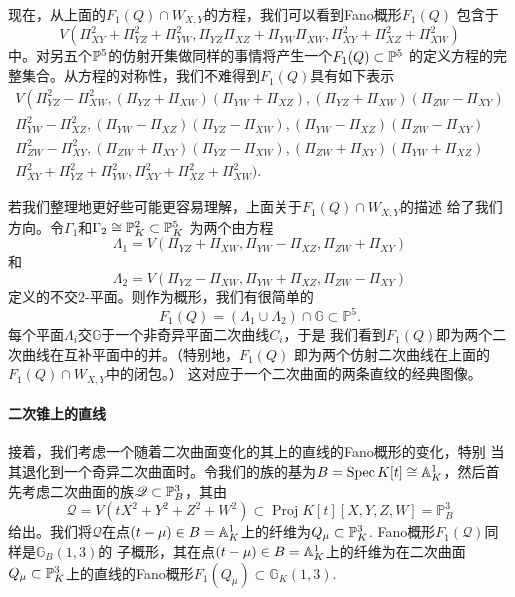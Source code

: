 现在，从上面的$F_1(Q)\cap W_{X,Y}$的方程，我们可以看到Fano概形$F_1(Q)$
包含于
\[
	V(\Pi_{XY}^2+\Pi_{YZ}^2+\Pi_{YW}^2,\Pi_{YZ}\Pi_{XZ}+\Pi_{YW}\Pi_{XW},\Pi_{XY}^2+\Pi_{XZ}^2+\Pi_{XW}^2)
\]
中。对另五个$\P^5$的仿射开集做同样的事情将产生一个$F_1(Q)\subset \P^5$
的定义方程的完整集合。从方程的对称性，我们不难得到$F_1(Q)$具有如下表示
\[
\begin{array}{l}{V\left(\Pi_{Y Z}^{2}-\Pi_{X W}^{2},\left(\Pi_{Y Z}+\Pi_{X W}\right)\left(\Pi_{Y W}+\Pi_{X Z}\right),\left(\Pi_{Y Z}+\Pi_{X W}\right)\left(\Pi_{Z W}-\Pi_{X Y}\right)\right.} \\ {\Pi_{Y W}^{2}-\Pi_{X Z}^{2},\left(\Pi_{Y W}-\Pi_{X Z}\right)\left(\Pi_{Y Z}-\Pi_{X W}\right),\left(\Pi_{Y W}-\Pi_{X Z}\right)\left(\Pi_{Z W}-\Pi_{X Y}\right)} \\ {\Pi_{Z W}^{2}-\Pi_{X Y}^{2},\left(\Pi_{Z W}+\Pi_{X Y}\right)\left(\Pi_{Y Z}-\Pi_{X W}\right),\left(\Pi_{Z W}+\Pi_{X Y}\right)\left(\Pi_{Y W}+\Pi_{X Z}\right)} \\ {\Pi_{X Y}^{2}+\Pi_{Y Z}^{2}+\Pi_{Y W}^{2}, \Pi_{X Y}^{2}+\Pi_{X Z}^{2}+\Pi_{X W}^{2} )}.\end{array}
\]

若我们整理地更好些可能更容易理解，上面关于$F_1(Q)\cap W_{X,Y}$的描述
给了我们方向。令$\Gamma_1$和$\Gamma_2\cong \P_K^2\subset \P_K^5$
为两个由方程
\[
	\Lambda_{1}=V\left(\Pi_{Y Z}+\Pi_{X W}, \Pi_{Y W}-\Pi_{X Z}, \Pi_{Z W}+\Pi_{X Y}\right)
\]
和
\[
	\Lambda_{2}=V\left(\Pi_{Y Z}-\Pi_{X W}, \Pi_{Y W}+\Pi_{X Z}, \Pi_{Z W}-\Pi_{X Y}\right)
\]
定义的不交$2$-平面。则作为概形，我们有很简单的
\[
	F_{1}(Q)=\left(\Lambda_{1} \cup \Lambda_{2}\right) \cap \mathbb{G} \subset \mathbb{P}^{5}.
\]%
%
%
每个平面$\Lambda_i$交$\mathbb G$于一个非奇异平面二次曲线$C_i$，于是
我们看到$F_1(Q)$即为两个二次曲线在互补平面中的并。（特别地，$F_1(Q)$
即为两个仿射二次曲线在上面的$F_1(Q)\cap W_{X,Y}$中的闭包。）
这对应于一个二次曲面的两条直纹的经典图像。\nottran


\paragraph*{二次锥上的直线}
接着，我们考虑一个随着二次曲面变化的其上的直线的Fano概形的变化，特别
当其退化到一个奇异二次曲面时。令我们的族的基为$B=\spec K[t]\cong
\A_K^1$，然后首先考虑二次曲面的族$\mathscr Q\subset \P_B^3$，其由
\[
	\mathscr{Q}=V\left(t X^{2}+Y^{2}+Z^{2}+W^{2}\right) \subset \operatorname{Proj} K[t][X, Y, Z, W]=\mathbb{P}_{B}^{3}
\]
给出。我们将$\mathscr Q$在点$(t-\mu)\in B=\A_K^1$上的纤维为$Q_\mu
\subset \P_K^3$. Fano概形$F_1(\mathscr Q)$同样是$\mathbb G_B(1,3)$的
子概形，其在点$(t-\mu)\in B=\A_K^1$上的纤维为在二次曲面$Q_\mu\subset 
\P_K^3$上的直线的Fano概形$F_1(Q_\mu)\subset \mathbb G_K(1,3)$.

